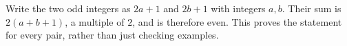 Write the two odd integers as $2a+1$ and $2b+1$ with integers $a,b$. Their sum is $2(a+b+1)$, a multiple of $2$, and is therefore even. This proves the statement for every pair, rather than just checking examples.
